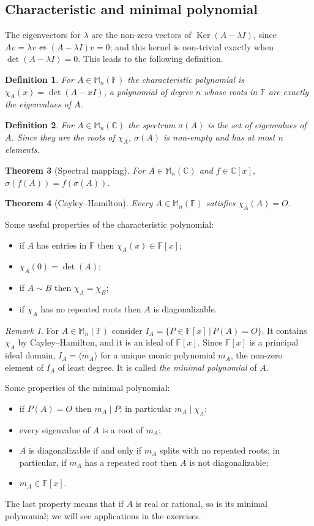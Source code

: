\documentclass[12pt]{article}
\newcommand{\double}{\hspace{2pt}}
\DeclareMathOperator{\Ker}{Ker}
\theoremstyle{breakplain}
\newtheorem{theorem}{Theorem}[section]
\theoremstyle{breakdef}
\newtheorem{definition}[theorem]{Definition}
\theoremstyle{remark}
\newtheorem*{remark}{Remark}
\begin{document}
\subsection{Characteristic and minimal polynomial}
The eigenvectors for $\lambda$ are the non-zero vectors of $\Ker(A-\lambda I)$, since $Av=\lambda v \iff (A-\lambda I)v=0$; and this kernel is non-trivial exactly when $\det(A-\lambda I)=0$. This leads to the following definition.
\begin{definition}
    For $A\in \mathbb{M}_n(\mathbb{F})$ the \emph{characteristic polynomial} is $\chi_A(x)=\det(A-xI)$, a polynomial of degree $n$ whose roots in $\mathbb{F}$ are exactly the eigenvalues of $A$.
\end{definition}
\begin{definition}
    For $A\in \mathbb{M}_n(\mathbb{C})$ the \emph{spectrum} $\sigma(A)$ is the set of eigenvalues of $A$. Since they are the roots of $\chi_A$, $\sigma(A)$ is non-empty and has at most $n$ elements.
\end{definition}
\begin{theorem}[Spectral mapping]
    For $A\in \mathbb{M}_n(\mathbb{C})$ and $f\in \mathbb{C}[x]$, $\sigma(f(A))=f(\sigma(A))$.
\end{theorem}
\begin{theorem}[Cayley--Hamilton]
    Every $A\in \mathbb{M}_n(\mathbb{F})$ satisfies $\chi_A(A)=O$.
\end{theorem}
Some useful properties of the characteristic polynomial:
\begin{itemize}
    \item if $A$ has entries in $\mathbb{F}$ then $ \chi_A(x)\in \mathbb{F}[x] $;
    \item $ \chi_A(0)=\det(A) $;
    \item if $A\sim B$ then $ \chi_A=\chi_B $;
    \item if $\chi_A$ has no repeated roots then $A$ is diagonalizable.
\end{itemize}
\begin{remark}
    For $ A \in \mathbb{M}_{n}(\mathbb{F})$ consider $ I_A=\{P\in \mathbb{F}[x] \double|\double P(A)=O\} $. It contains $\chi_A$ by Cayley--Hamilton, and it is an ideal of $\mathbb{F}[x]$. Since $\mathbb{F}[x]$ is a principal ideal domain, $I_A=\langle m_A\rangle$ for a unique monic polynomial $m_A$, the non-zero element of $I_A$ of least degree. It is called \emph{the minimal polynomial} of $A$.
\end{remark}
Some properties of the minimal polynomial:
\begin{itemize}
    \item if $P(A)=O$ then $m_A\mid P$; in particular $m_A\mid \chi_A$;
    \item every eigenvalue of $A$ is a root of $m_A$;
    \item $A$ is diagonalizable if and only if $m_A$ splits with no repeated roots; in particular, if $m_A$ has a repeated root then $A$ is not diagonalizable;
    \item $m_A\in \mathbb{F}[x]$.
\end{itemize}
The last property means that if $A$ is real or rational, so is its minimal polynomial; we will see applications in the exercises.
\end{document}

